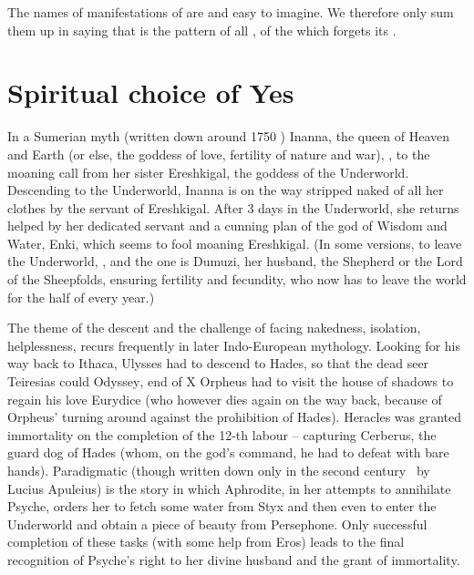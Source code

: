 The names of manifestations of  are  and easy to
imagine. We therefore only sum them up in saying that  is 
the pattern of all ,  of the  which forgets its . 


\section{Spiritual choice of Yes}\label{sec:schYes}
%
\pa
In a Sumerian myth (written down around 1750 \bc)  Inanna, the queen of
Heaven and Earth (or else, the goddess of love, fertility of nature and war),
, 
to the moaning call from her sister Ereshkigal, the goddess of the Underworld.
Descending to the Underworld, Inanna is on the way stripped naked of all her
clothes by the servant of Ereshkigal. After 3 days in the Underworld, she returns
helped by her dedicated servant and a cunning plan of the god of Wisdom and
Water, Enki, which seems to fool moaning Ereshkigal. (In some versions, to leave
the Underworld, , and the one is
Dumuzi, her husband, the Shepherd or the Lord of the Sheepfolds, ensuring
fertility and fecundity, who now has to leave the world for the half of every year.)

The theme of the descent and the challenge of facing nakedness, isolation,
helplessness, recurs frequently  in later Indo-European
mythology.  Looking for his way back to Ithaca, Ulysses had to descend to Hades,
so that the dead seer Teiresias could \citet{tell you about your voyage -- what
  stages you are to make, and how you are to sail the sea so as to reach your
  home.}{Odyssey}{$\!\!$, end of X} Orpheus had to visit the house of shadows to
regain his love Eurydice (who however dies again on the way back, because of
Orpheus' turning around against the prohibition of Hades).  Heracles was granted
immortality on the completion of the 12-th labour -- capturing Cerberus, the
guard dog of Hades (whom, on the god's command, he had to defeat with bare
hands).
Paradigmatic (though written down only in the second century \add\ by Lucius Apuleius)
is the story in which  {Aphrodite}, in 
her attempts to annihilate {Psyche}, orders her to fetch some water from
{Styx} and then 
even to enter the Underworld and obtain a piece of beauty from
{Persephone}. Only successful completion of these tasks (with some help from
{Eros}) leads to the final recognition of {Psyche's} right to her divine
husband and the grant of immortality.

